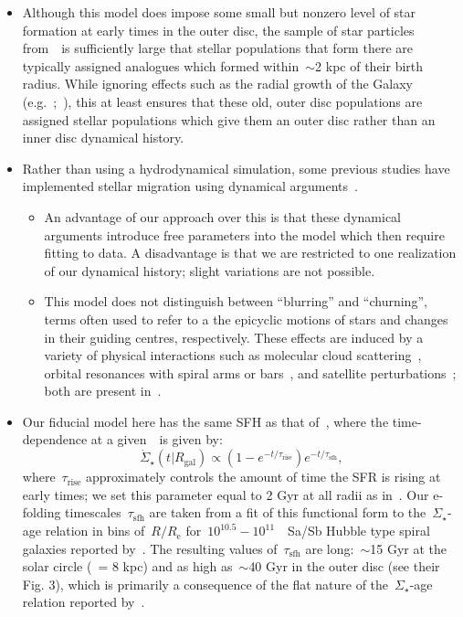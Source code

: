 \documentclass[ms.tex]{subfiles}
\begin{document}
\begin{itemize}
	\item Although this model does impose some small but nonzero level of star 
	formation at early times in the outer disc, the sample of star particles 
	from~\hsim~is sufficiently large that stellar populations that form there 
	are typically assigned analogues which formed within~$\sim$2 kpc of their 
	birth radius. 
	While ignoring effects such as the radial growth of the Galaxy 
	(e.g.~\citealp*{Bird2012};~\citealp{Bird2013}), this at least ensures that 
	these old, outer disc populations are assigned stellar populations which 
	give them an outer disc rather than an inner disc dynamical history. 

	\item Rather than using a hydrodynamical simulation, some previous studies 
	have implemented stellar migration using dynamical 
	arguments~\citep[e.g.][]{Schoenrich2009, Sharma2020}. 
	\begin{itemize} 
		\item An advantage of our approach over this is that these dynamical 
		arguments introduce free parameters into the model which then require 
		fitting to data. 
		A disadvantage is that we are restricted to one realization of our 
		dynamical history; slight variations are not possible. 

		\item This model does not distinguish between ``blurring'' and 
		``churning'', terms often used to refer to a the epicyclic motions of 
		stars and changes in their guiding centres, respectively. 
		These effects are induced by a variety of physical interactions such as 
		molecular cloud scattering~\citep{Mihalas1981, Jenkins1990, 
		Jenkins1992}, orbital resonances with spiral arms or 
		bars~\citep{Sellwood2002, Minchev2011}, and satellite 
		perturbations~\citep{Bird2012}; both are present in~\hsim. 
	\end{itemize} 

	\item Our fiducial model here has the same SFH as that 
	of~\citet{Johnson2021}, where the time-dependence at a given~\rgal~is given 
	by: 
	\begin{equation} 
	\dot{\Sigma}_\star(t|R_\text{gal}) \propto 
	(1 - e^{-t/\tau_\text{rise}})e^{-t/\tau_\text{sfh}}, 
	\end{equation} 
	where~$\tau_\text{rise}$ approximately controls the amount of time the SFR 
	is rising at early times; we set this parameter equal to 2 Gyr at all 
	radii as in~\citet{Johnson2021}. 
	Our e-folding timescales~$\tau_\text{sfh}$ are taken from a fit of this 
	functional form to the~$\Sigma_\star$-age relation in bins of~$R/R_\text{e}$ 
	for~$10^{10.5} - 10^{11}$~\msun~Sa/Sb Hubble type spiral galaxies reported 
	by~\citet{Sanchez2020}. 
	The resulting values of~$\tau_\text{sfh}$ are long:~$\sim$15 Gyr at the 
	solar circle (\rgal~= 8 kpc) and as high as~$\sim$40 Gyr in the outer disc 
	(see their Fig. 3), which is primarily a consequence of the flat nature 
	of the~$\Sigma_\star$-age relation reported by~\citet{Sanchez2020}. 


\end{itemize}
\end{document}
